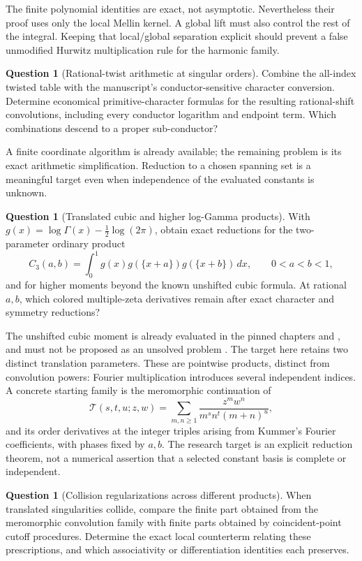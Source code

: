 \documentclass[11pt,letterpaper]{article}
\numberwithin{equation}{section}
\theoremstyle{plain}
\theoremstyle{definition}
\newtheorem{question}[theorem]{Question}
\theoremstyle{remark}
\begin{document}
The finite polynomial identities are exact, not asymptotic.
Nevertheless their proof uses only the local Mellin kernel. A
global lift must also control the rest of the integral. Keeping
that local/global separation explicit should prevent a false
unmodified Hurwitz multiplication rule for the harmonic family.

\begin{question}[Rational-twist arithmetic at singular orders]
\label{future:q:characters}
Combine the all-index twisted table with the manuscript's
conductor-sensitive character conversion. Determine economical
primitive-character formulas for the resulting rational-shift
convolutions, including every conductor logarithm and endpoint
term. Which combinations descend to a proper sub-conductor?
\end{question}

A finite coordinate algorithm is already available; the remaining
problem is its exact arithmetic simplification. Reduction to a
chosen spanning set is a meaningful target even when independence
of the evaluated constants is unknown.

\begin{question}[Translated cubic and higher log-Gamma products]
\label{future:q:moments}
With \(g(x)=\log\Gamma(x)-\tfrac12\log(2\pi)\), obtain exact reductions
for the two-parameter ordinary product
\[
 C_3(a,b)=\int_0^1g(x)g(\{x+a\})g(\{x+b\})\,dx,
 \qquad 0<a<b<1,
\]
and for higher moments beyond the known unshifted cubic formula.
At rational \(a,b\), which colored multiple-zeta derivatives remain
after exact character and symmetry reductions?
\end{question}

The unshifted cubic moment is already evaluated in the pinned chapters
 and ,
and must not be proposed as an unsolved problem
\cite{RepoManuscript}. The target here retains two distinct translation
parameters. These are pointwise products, distinct from convolution
powers: Fourier multiplication introduces several independent indices.
A concrete starting family is the meromorphic continuation of
\[
 \mathcal T(s,t,u;z,w)=
 \sum_{m,n\geq1}\frac{z^mw^n}{m^s n^t(m+n)^u},
\]
and its order derivatives at the integer triples arising from
Kummer's Fourier coefficients, with phases fixed by \(a,b\).
The research target is an explicit
reduction theorem, not a numerical assertion that a selected
constant basis is complete or independent.

\begin{question}[Collision regularizations across different products]
\label{future:q:collisions}
When translated singularities collide, compare the finite part
obtained from the meromorphic convolution family with finite parts
obtained by coincident-point cutoff procedures. Determine the
exact local counterterm relating these prescriptions, and which
associativity or differentiation identities each preserves.
\end{question}
\end{document}
